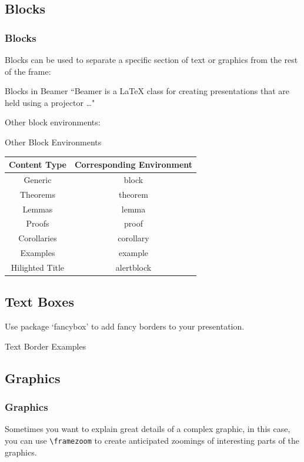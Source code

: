 \documentclass[11pt,pdf,aspectratio=43]{beamer}
\begin{document}
\subsection*{Blocks}
\begin{frame}
    \frametitle{Blocks}
    Blocks can be used to separate a specific section of text or graphics from the rest of the frame: \\
    \begin{block}{Blocks in Beamer}
	``Beamer is a \LaTeX{} class for creating presentations that are held using a projector \ldots "
    \end{block}
    Other block environments:
    \begin{block}{Other Block Environments}
	\begin{tabular}{c|c}
	    \textbf{Content Type}   & \textbf{Corresponding Environment}    \\
	    \hline
	    Generic &	block	\\
	    Theorems	&   theorem \\
	    Lemmas  &	lemma	\\
	    Proofs  &	proof	\\
	    Corollaries	&   corollary	\\
	    Examples	&   example	\\
	    Hilighted Title &	alertblock  \\  
	    \hline
	\end{tabular}
    \end{block}
\end{frame}

\subsection*{Text Boxes}
\begin{frame}
    Use package `fancybox' to add fancy borders to your presentation.   \\
    \begin{block}{Text Border Examples}
    \end{block}
\end{frame}

\subsection*{Graphics}
\begin{frame}[fragile]
    \frametitle{Graphics}

    Sometimes you want to explain great details of a complex graphic, in
    this case, you can use \verb|\framezoom| to create anticipated 
    zoomings of interesting parts of the graphics.

\end{frame}
\end{document}
